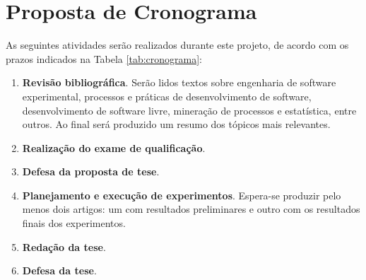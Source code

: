 \documentclass{article}
\begin{document}

\section{Proposta de Cronograma}

As seguintes atividades serão realizados durante este projeto, de acordo com os
prazos indicados na Tabela \ref{tab:cronograma}:

\begin{enumerate}
  \item \label{prevista:estudos}
    \textbf{Revisão bibliográfica}. Serão lidos textos sobre engenharia de software
    experimental, processos e práticas de desenvolvimento de software,
    desenvolvimento de software livre, mineração de processos e estatística,
    entre outros. Ao final será produzido um resumo dos tópicos mais relevantes.
  \item \label{prevista:qualificacao}
    \textbf{Realização do exame de qualificação}.
  \item \label{prevista:proposta}
    \textbf{Defesa da proposta de tese}.
  \item \label{prevista:experimentos}
    \textbf{Planejamento e execução de experimentos}. Espera-se produzir pelo menos dois
    artigos: um com resultados preliminares e outro com os resultados finais dos
    experimentos.
  \item \label{prevista:redacao}
    \textbf{Redação da tese}.
  \item \label{prevista:defesa}
    \textbf{Defesa da tese}.
\end{enumerate}
\end{document}
